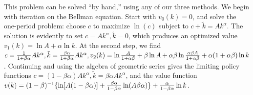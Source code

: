   This problem can be solved ``by hand,'' using any of our three methods.
We begin with iteration on the Bellman equation.
Start with $v_0(k) = 0$, and solve the one-period problem:
choose $c$ to maximize $\ln (c)$ subject to
$c + \tilde k = A k^\alpha.$  The solution
is evidently to set $c=Ak^\alpha, \tilde k=0$, which
produces an optimized value $v_1(k) = \ln A + \alpha \ln k$.
At the second step, we find $c= {1 \over 1 + \beta \alpha} A k^\alpha,
\tilde k = {\beta \alpha \over 1 + \beta \alpha}A k^\alpha,
v_2(k) = \ln {A \over 1 + \alpha \beta} + \beta \ln A
+ \alpha \beta \ln{\alpha \beta A \over 1 + \alpha \beta}
+ \alpha (1+\alpha \beta) \ln k$.  Continuing and using
the algebra of geometric series gives the
limiting policy functions $c=(1-\beta \alpha) A k^\alpha,
\tilde k = \beta \alpha  A k^\alpha$,
and the value function $v(k) = (1-\beta)^{-1}\{ \ln[A(1-\beta\alpha)]
+ {\beta \alpha \over 1-\beta \alpha} \ln(A\beta \alpha)\}
+ {\alpha \over 1-\beta\alpha} \ln k$.
\smallskip

